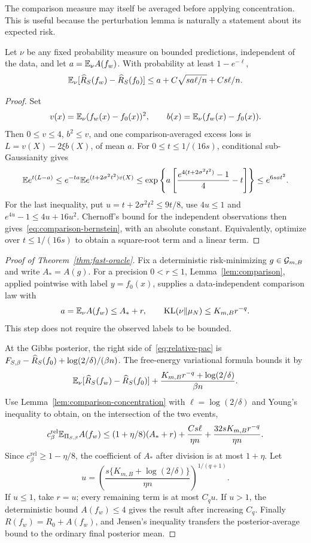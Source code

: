 The comparison measure may itself be averaged before applying concentration. This is useful because the perturbation lemma is naturally a statement about its expected risk.

\begin{lemma}\label{lem:comparison-concentration}
Let $\nu$ be any fixed probability measure on bounded predictions, independent of the data, and let $a=\mathbb E_\nu A(f_w)$. With probability at least $1-e^{-\ell}$,
\begin{equation}
 \mathbb E_\nu[\widehat R_S(f_w)-\widehat R_S(f_0)]
 \le a+C\sqrt{sa\ell/n}+Cs\ell/n.
 \label{eq:comparison-bernstein}
\end{equation}
\end{lemma}
\begin{proof}
Set
\[
 v(x)=\mathbb E_\nu(f_w(x)-f_0(x))^2,\qquad
 b(x)=\mathbb E_\nu(f_w(x)-f_0(x)).
\]
Then $0\le v\le4$, $b^2\le v$, and one comparison-averaged excess loss is $L=v(X)-2\xi b(X)$, of mean $a$. For $0\le t\le1/(16s)$, conditional sub-Gaussianity gives
\[
 \mathbb E e^{t(L-a)}
 \le e^{-ta}\mathbb E e^{(t+2\sigma^2t^2)v(X)}
 \le\exp\left\{a\left[\frac{e^{4(t+2\sigma^2t^2)}-1}{4}-t\right]\right\}
 \le e^{6sa t^2}.
\]
For the last inequality, put $u=t+2\sigma^2t^2\le9t/8$, use $4u\le1$ and $e^{4u}-1\le4u+16u^2$. Chernoff's bound for the independent observations then gives~\eqref{eq:comparison-bernstein}, with an absolute constant. Equivalently, optimize over $t\le1/(16s)$ to obtain a square-root term and a linear term.
\end{proof}

\begin{proof}[Proof of Theorem~\ref{thm:fast-oracle}]
Fix a deterministic risk-minimizing $g\in\mathcal G_{m,B}$ and write $A_*=A(g)$. For a precision $0<r\le1$, Lemma~\ref{lem:comparison}, applied pointwise with label $y=f_0(x)$, supplies a data-independent comparison law with
\[
 a=\mathbb E_\nu A(f_w)\le A_*+r,
 \qquad \operatorname{KL}(\nu\|\mu_N)\le K_{m,B}r^{-q}.
\]
This step does not require the observed labels to be bounded.

At the Gibbs posterior, the right side of~\eqref{eq:relative-pac} is
$F_{S,\beta}-\widehat R_S(f_0)+\log(2/\delta)/(\beta n)$.
The free-energy variational formula bounds it by
\[
 \mathbb E_\nu[\widehat R_S(f_w)-\widehat R_S(f_0)]
       +\frac{K_{m,B}r^{-q}+\log(2/\delta)}{\beta n}.
\]
Use Lemma~\ref{lem:comparison-concentration} with $\ell=\log(2/\delta)$ and Young's inequality to obtain, on the intersection of the two events,
\[
 c_\beta^{\mathrm{rel}}\mathbb E_{\Pi_{S,\beta}}A(f_w)
 \le(1+\eta/8)(A_*+r)
       +\frac{Cs\ell}{\eta n}
       +\frac{32sK_{m,B}r^{-q}}{\eta n}.
\]
Since $c_\beta^{\mathrm{rel}}\ge1-\eta/8$, the coefficient of $A_*$ after division is at most $1+\eta$. Let
\[
 u=\left(\frac{s\{K_{m,B}+\log(2/\delta)\}}{\eta n}\right)^{1/(q+1)}.
\]
If $u\le1$, take $r=u$; every remaining term is at most $C_q u$. If $u>1$, the deterministic bound $A(f_w)\le4$ gives the result after increasing $C_q$. Finally $R(f_w)=R_0+A(f_w)$, and Jensen's inequality transfers the posterior-average bound to the ordinary final posterior mean.
\end{proof}

